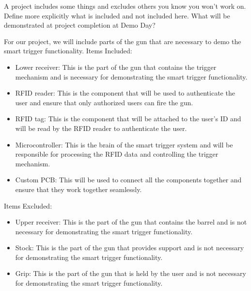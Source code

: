


A project includes some things and excludes others you know you won't work on. 
Define more explicitly what is included and not included here. 
What will be demonstrated at project completion at Demo Day?

For our project, we will include parts of the gun that are necessary to demo the smart trigger functionality. 
Items Included:
\begin{itemize}
    \item Lower receiver: This is the part of the gun that contains the trigger mechanism and is necessary for demonstrating the smart trigger functionality.
    \item RFID reader: This is the component that will be used to authenticate the user and ensure that only authorized users can fire the gun.
    \item RFID tag: This is the component that will be attached to the user's ID and will be read by the RFID reader to authenticate the user.
    \item Microcontroller: This is the brain of the smart trigger system and will be responsible for processing the RFID data and controlling the trigger mechanism.
    \item Custom PCB: This will be used to connect all the components together and ensure that they work together seamlessly.
\end{itemize}
Items Excluded:
\begin{itemize}
    \item Upper receiver: This is the part of the gun that contains the barrel and is not necessary for demonstrating the smart trigger functionality.
    \item Stock: This is the part of the gun that provides support and is not necessary for demonstrating the smart trigger functionality.
    \item Grip: This is the part of the gun that is held by the user and is not necessary for demonstrating the smart trigger functionality.
\end{itemize}
